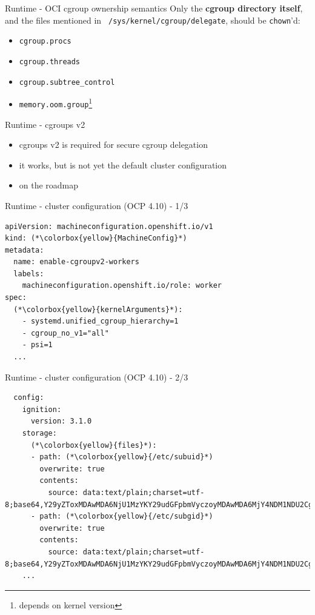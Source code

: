 \documentclass[ignorenonframetext,aspectratio=169,12pt]{beamer}
\begin{document}
\begin{frame}{Runtime - OCI cgroup ownership semantics}
\protect\hypertarget{openshift-cgroup-ownership-semantics-files}{}
Only the {\bf cgroup directory itself}, and the files mentioned in {\tt
/sys/kernel/cgroup/delegate}, should be {\tt chown}'d:

\begin{itemize}
\item {\tt cgroup.procs}
\item {\tt cgroup.threads}
\item {\tt cgroup.subtree\_control}
\item {\tt memory.oom.group}\footnote{depends on kernel version}
\end{itemize}

\end{frame}


\begin{frame}{Runtime - cgroups v2}
\protect\hypertarget{openshift-cgroups-v2}{}
\begin{itemize}
\item cgroups v2 is required for secure cgroup delegation
\item it works, but is not yet the default cluster configuration
\item on the roadmap
\end{itemize}
\end{frame}

\begin{frame}[fragile]{Runtime - cluster configuration (OCP 4.10) - 1/3}
\protect\hypertarget{openshift-cluster-config-1}{}
\begin{lstlisting}
apiVersion: machineconfiguration.openshift.io/v1
kind: (*\colorbox{yellow}{MachineConfig}*)
metadata:
  name: enable-cgroupv2-workers
  labels:
    machineconfiguration.openshift.io/role: worker
spec:
  (*\colorbox{yellow}{kernelArguments}*):
    - systemd.unified_cgroup_hierarchy=1
    - cgroup_no_v1="all"
    - psi=1
  ...
\end{lstlisting}
\end{frame}

\begin{frame}[fragile]{Runtime - cluster configuration (OCP 4.10) - 2/3}
\protect\hypertarget{openshift-cluster-config-2}{}
\begin{lstlisting}
  config:
    ignition:
      version: 3.1.0
    storage:
      (*\colorbox{yellow}{files}*):
      - path: (*\colorbox{yellow}{/etc/subuid}*)
        overwrite: true
        contents:
          source: data:text/plain;charset=utf-8;base64,Y29yZToxMDAwMDA6NjU1MzYKY29udGFpbmVyczoyMDAwMDA6MjY4NDM1NDU2Cg==
      - path: (*\colorbox{yellow}{/etc/subgid}*)
        overwrite: true
        contents:
          source: data:text/plain;charset=utf-8;base64,Y29yZToxMDAwMDA6NjU1MzYKY29udGFpbmVyczoyMDAwMDA6MjY4NDM1NDU2Cg==
    ...
\end{lstlisting}
\end{frame}
\end{document}
